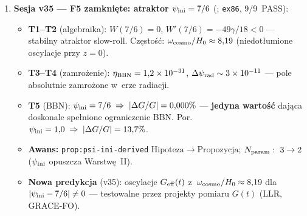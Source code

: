 \begin{remark}
\begin{enumerate}[nosep]
  \item \textbf{Sesja v35 --- F5 zamkni\k{e}te:
    atraktor $\psi_{\rm ini} = 7/6$} (;
    \texttt{ex86}, 9/9~PASS):
    \begin{itemize}[nosep]
      \item \textbf{T1--T2} (algebraika): $W(7/6) = 0$,
        $W'(7/6) = -49\gamma/18 < 0$ --- stabilny atraktor slow-roll.
        Cz\k{e}sto\'s\'c: $\omega_{\rm cosmo}/H_0 \approx 8{,}19$
        (niedot\l{}umione oscylacje przy $z=0$).
      \item \textbf{T3--T4} (zamro\.zenie): $\eta_{\rm BBN} = 1{,}2\times10^{-31}$,
        $\Delta\psi_{\rm rad} \sim 3\times10^{-11}$ ---
        pole absolutnie zamro\.zone w~erze radiacji.
      \item \textbf{T5} (BBN): $\psi_{\rm ini} = 7/6
        \;\Rightarrow\; |\Delta G/G| = 0{,}000\%$ ---
        \textbf{jedyna warto\'s\'c} daj\k{a}ca doskonale
        spe\l{}nione ograniczenie BBN.
        Por.\ $\psi_{\rm ini} = 1{,}0 \;\Rightarrow\; |\Delta G/G| = 13{,}7\%$.
      \item \textbf{Awans:} \texttt{prop:psi-ini-derived}
        $\mathrm{Hipoteza} \to \mathrm{Propozycja}$;
        $N_{\rm param}:\ 3 \to 2$
        ($\psi_{\rm ini}$ opuszcza Warstw\k{e}~II).
      \item \textbf{Nowa predykcja} (v35): oscylacje $G_{\rm eff}(t)$
        z~$\omega_{\rm cosmo}/H_0 \approx 8{,}19$ dla
        $|\psi_{\rm ini} - 7/6| \neq 0$ --- testowalne przez
        projekty pomiaru $G(t)$ (LLR, GRACE-FO).
    \end{itemize}


\end{enumerate}
\end{remark}

